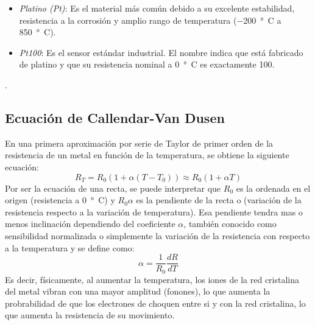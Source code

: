 \begin{itemize}
\item \emph{Platino (Pt)}: Es el material más común debido a su excelente estabilidad, resistencia a la corrosión y amplio rango de temperatura (\qty{-200}{\degree C} a \qty{850}{\degree C}).
\item \emph{Pt100}: Es el sensor estándar industrial. El nombre indica que está fabricado de platino y que su resistencia nominal a \qty{0}{\degree C} es exactamente \qty{100}{\Omega}.
\end{itemize}
.


\subsection{Ecuación de Callendar-Van Dusen}

En una primera aproximación por serie de Taylor de primer orden de la resistencia de un metal en función de la temperatura, se obtiene la siguiente ecuación:
\begin{equation} \label{eq:ecuacion_lineal}
    R_T = R_0 (1 + \alpha(T - T_0)) \approx R_0 (1 + \alpha T)
\end{equation}
Por ser la ecuación de una recta, se puede interpretar que $R_0$ es la ordenada en el origen (resistencia a \qty{0}{\degree C}) y $R_0 \alpha$ es la pendiente de la recta o (variación de la resistencia respecto a la variación de temperatura). Esa pendiente tendra mas o menos inclinación dependiendo del coeficiente $\alpha$, también conocido como sensibilidad normalizada o simplemente la variación de la resistencia con respecto a la temperatura y se define como:
\begin{equation}
    \alpha = \frac{1}{R_0} \frac{dR}{dT}
\end{equation}
Es decir, físicamente, al aumentar la temperatura, los iones de la red cristalina del metal vibran con una mayor amplitud (fonones), lo que aumenta la probrabilidad de que los electrones de choquen entre si y con la red cristalina, lo que aumenta la resistencia de su movimiento.

